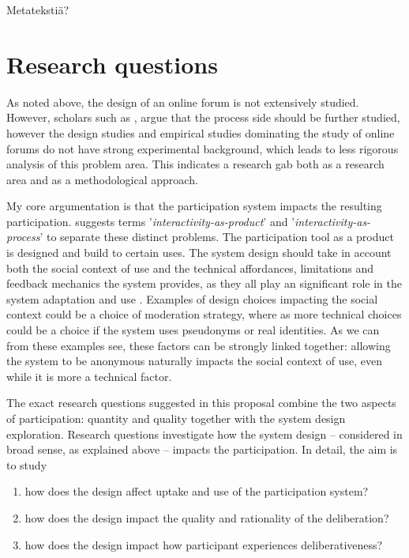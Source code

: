 \documentclass{article}
\begin{document}
Metatekstiä?

\section{Research questions}

As noted above, the design of an online forum is not extensively studied. However, scholars such as , argue that the process side should be further studied, however the design studies and empirical studies dominating the study of online forums do not have strong experimental background, which leads to less rigorous analysis of this problem area. This indicates a research gab both as a research area and as a methodological approach.

My core argumentation is that the participation system impacts the resulting participation.  suggests terms '\textit{interactivity-as-product}' and '\textit{interactivity-as-process}' to separate these distinct problems. The participation tool as a product is designed and build to certain uses. The system design should take in account both the social context of use and the technical affordances, limitations and feedback mechanics the system provides, as they all play an significant role in the system adaptation and use . Examples of design choices impacting the social context could be a choice of moderation strategy, where as more technical choices could be a choice if the system uses pseudonyms or real identities. As we can from these examples see, these factors can be strongly linked together: allowing the system to be anonymous naturally impacts the social context of use, even while it is more a technical factor.

The exact research questions suggested in this proposal combine the two aspects of participation: quantity and quality  together with the system design exploration. Research questions investigate how the system design -- considered in broad sense, as explained above -- impacts the participation. In detail, the aim is to study

\begin{enumerate}
\item how does the design affect uptake and use of the participation system?
\item how does the design impact the quality and rationality of the deliberation?
\item how does the design impact how participant experiences deliberativeness?
\end{enumerate}
\end{document}
